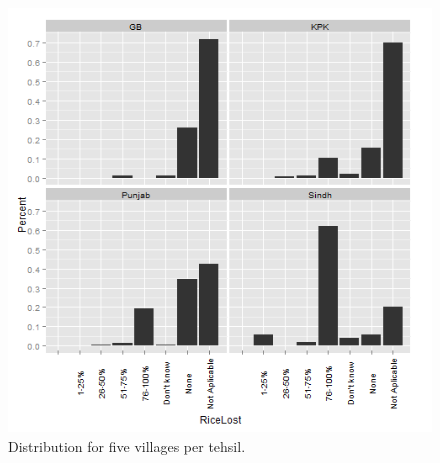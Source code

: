 \begin{figure}[!hbtp]
\begin{knitrout}
\begin{kframe}
\begin{flushleft}
\hlstd{}{\ }{\ }{\ }{\ }\hlkeyword{)}\hlkeyword{)}\hspace*{\fill}\\
\hlstd{}\hlkeyword{\usebox{\hlnormalsizeboxdollar}}\hlassignement{\usebox{\hlnormalsizeboxlessthan}-}{\ }\hlkeyword{(}\hlargument{=}{\ }\hlkeyword{\usebox{\hlnormalsizeboxdollar}}\hlkeyword{,}\hspace*{\fill}\\
\hlstd{}{\ }{\ }{\ }{\ }\hlkeyword{)}\hspace*{\fill}\\
\hlstd{}\hlkeyword{(}\hlkeyword{,}{\ }\hlkeyword{(}\hlargument{=}{\ }\hlkeyword{,}{\ }\hlargument{=}{\ }\hlkeyword{)}\hlkeyword{)}{\ }\hlkeyword{+}{\ }\hlkeyword{(}\hlargument{=}{\ }\hlkeyword{)}{\ }\hlkeyword{+}\hspace*{\fill}\\
\hlstd{}{\ }{\ }{\ }{\ }\hlkeyword{(}\hlkeyword{\urltilda{}}\hlkeyword{)}{\ }\hlkeyword{+}{\ }\hlkeyword{(}\hlargument{=}{\ }\hlkeyword{(}\hlargument{=}{\ }\hlkeyword{)}\hlkeyword{)}\mbox{}
\normalfont
\end{flushleft}
\end{kframe}\includegraphics[width=.9\linewidth]{writeup/overall/figuresfiveDist} 
\end{knitrout}

\caption{Distribution for five villages per tehsil.\label{fig:fiveDist}}
\end{figure}
